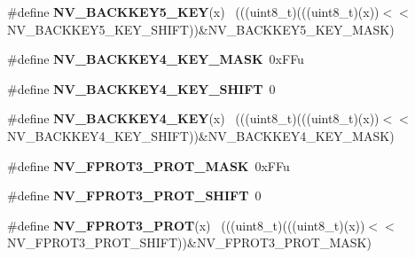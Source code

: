 \begin{DoxyCompactItemize}
\item 
\hypertarget{group___n_v___register___masks_gafcbf4418e3079604800f92142c11c249}{}\#define {\bfseries N\+V\+\_\+\+B\+A\+C\+K\+K\+E\+Y5\+\_\+\+K\+E\+Y}(x)                                          ~(((uint8\+\_\+t)(((uint8\+\_\+t)(x))$<$$<$N\+V\+\_\+\+B\+A\+C\+K\+K\+E\+Y5\+\_\+\+K\+E\+Y\+\_\+\+S\+H\+I\+F\+T))\&N\+V\+\_\+\+B\+A\+C\+K\+K\+E\+Y5\+\_\+\+K\+E\+Y\+\_\+\+M\+A\+S\+K)\label{group___n_v___register___masks_gafcbf4418e3079604800f92142c11c249}

\item 
\hypertarget{group___n_v___register___masks_ga49a74f76cf8b7787284ac6e510e4e0c3}{}\#define {\bfseries N\+V\+\_\+\+B\+A\+C\+K\+K\+E\+Y4\+\_\+\+K\+E\+Y\+\_\+\+M\+A\+S\+K}~0x\+F\+Fu\label{group___n_v___register___masks_ga49a74f76cf8b7787284ac6e510e4e0c3}

\item 
\hypertarget{group___n_v___register___masks_gadfa9b097c522673010b11e94a5a7b9eb}{}\#define {\bfseries N\+V\+\_\+\+B\+A\+C\+K\+K\+E\+Y4\+\_\+\+K\+E\+Y\+\_\+\+S\+H\+I\+F\+T}~0\label{group___n_v___register___masks_gadfa9b097c522673010b11e94a5a7b9eb}

\item 
\hypertarget{group___n_v___register___masks_ga51340cca5ef5a77628cc40a0566f32f8}{}\#define {\bfseries N\+V\+\_\+\+B\+A\+C\+K\+K\+E\+Y4\+\_\+\+K\+E\+Y}(x)                                          ~(((uint8\+\_\+t)(((uint8\+\_\+t)(x))$<$$<$N\+V\+\_\+\+B\+A\+C\+K\+K\+E\+Y4\+\_\+\+K\+E\+Y\+\_\+\+S\+H\+I\+F\+T))\&N\+V\+\_\+\+B\+A\+C\+K\+K\+E\+Y4\+\_\+\+K\+E\+Y\+\_\+\+M\+A\+S\+K)\label{group___n_v___register___masks_ga51340cca5ef5a77628cc40a0566f32f8}

\item 
\hypertarget{group___n_v___register___masks_ga1a2ecc3ba1f6ae4c2db7fcaa8f369b34}{}\#define {\bfseries N\+V\+\_\+\+F\+P\+R\+O\+T3\+\_\+\+P\+R\+O\+T\+\_\+\+M\+A\+S\+K}~0x\+F\+Fu\label{group___n_v___register___masks_ga1a2ecc3ba1f6ae4c2db7fcaa8f369b34}

\item 
\hypertarget{group___n_v___register___masks_gaee74e224c0572f7618f28c11d921b6e3}{}\#define {\bfseries N\+V\+\_\+\+F\+P\+R\+O\+T3\+\_\+\+P\+R\+O\+T\+\_\+\+S\+H\+I\+F\+T}~0\label{group___n_v___register___masks_gaee74e224c0572f7618f28c11d921b6e3}

\item 
\hypertarget{group___n_v___register___masks_ga480ba67bcc94573ed72a579f378d99a1}{}\#define {\bfseries N\+V\+\_\+\+F\+P\+R\+O\+T3\+\_\+\+P\+R\+O\+T}(x)                                            ~(((uint8\+\_\+t)(((uint8\+\_\+t)(x))$<$$<$N\+V\+\_\+\+F\+P\+R\+O\+T3\+\_\+\+P\+R\+O\+T\+\_\+\+S\+H\+I\+F\+T))\&N\+V\+\_\+\+F\+P\+R\+O\+T3\+\_\+\+P\+R\+O\+T\+\_\+\+M\+A\+S\+K)\label{group___n_v___register___masks_ga480ba67bcc94573ed72a579f378d99a1}


\end{DoxyCompactItemize}
